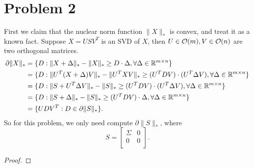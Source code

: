 \section{Problem 2}

First we claim that the nuclear norm function $\|X\|_*$ is convex,
and treat it as a known fact.
Suppose $X=USV^T$ is an SVD of $X$,
then $U\in\mathcal{O}(m), V\in\mathcal{O}(n)$ are two orthogonal matrices.
\begin{equation}
\begin{split}
    \partial \|X\|_*
        &=\{D:\|X+\Delta\|_*-\|X\|_*\ge D\cdot\Delta, \forall\Delta\in{\mathbb{R}}^{m\times n}\} \\
        &=\{D:\|U^T(X+\Delta)V\|_*-\|U^TXV\|_*\ge (U^TDV)\cdot(U^T\Delta V), \forall\Delta\in{\mathbb{R}}^{m\times n}\} \\
        &=\{D:\|S+U^T\Delta V\|_*-\|S\|_*\ge (U^TDV)\cdot(U^T\Delta V), \forall\Delta\in{\mathbb{R}}^{m\times n}\} \\
        &=\{D:\|S+\Delta\|_*-\|S\|_*\ge (U^TDV)\cdot\Delta, \forall\Delta\in{\mathbb{R}}^{m\times n}\} \\
        &=\{UDV^T: D\in\partial \|S\|_*\}.
\end{split}
\end{equation}
So for this problem,
we only need compute $\partial\|S\|_*$,
where
\begin{equation}
    S=\begin{bmatrix}
    \Sigma       & 0 \\
    0       & 0 \\
\end{bmatrix}.
\end{equation}
\begin{claim}

\end{claim}
\begin{proof}

\end{proof}
